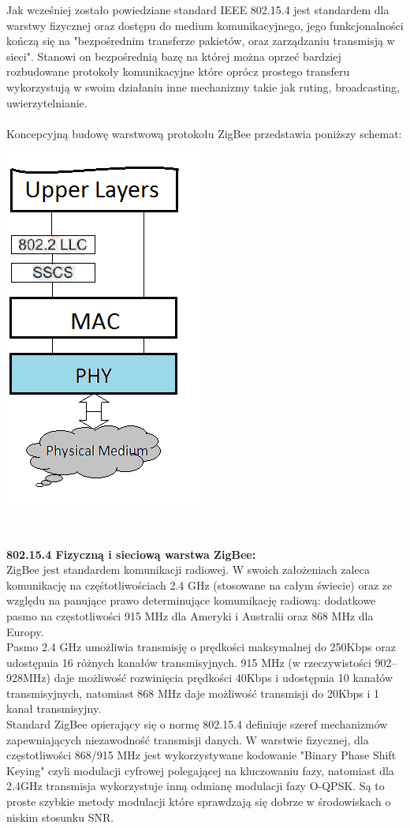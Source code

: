 \tab 	Jak wcześniej zostało powiedziane standard IEEE 802.15.4 jest standardem dla warstwy fizycznej oraz dostępu do medium komunikacyjnego, jego funkcjonalności kończą się na "bezpośrednim transferze pakietów, oraz zarządzaniu transmisją w sieci". Stanowi on bezpośrednią bazę na której można oprzeć bardziej rozbudowane protokoły komunikacyjne które oprócz prostego transferu wykorzystują w swoim działaniu inne mechanizmy takie jak ruting, broadcasting, uwierzytelnianie. \\
\\
Koncepcyjną budowę warstwową protokołu ZigBee przedstawia poniższy schemat: \\
\centerline{\includegraphics[scale=0.5]{./img/img_1__2_1_3}}
\\

\par \tab \textbf{802.15.4 Fizyczną i sieciową warstwa ZigBee:} \\ 
\tab 	ZigBee jest standardem komunikacji radiowej. W swoich założeniach zaleca komunikację na częśtotliwościach 2.4 GHz (stosowane na całym świecie) oraz ze względu na panujące prawo determinujące komumikację radiową: dodatkowe pasmo na częstotliwości 915 MHz dla Ameryki i Australii oraz 868 MHz dla Europy. \\
\tab 	Pasmo 2.4 GHz umożliwia transmisję o prędkości maksymalnej do 250Kbps oraz udostępnia 16 różnych kanałów transmisyjnych. 915 MHz (w rzeczywistości 902–928MHz) daje możliwość rozwinięcia prędkości 40Kbps i udostępnia 10 kanałów transmisyjnych, natomiast 868 MHz daje możliwość transmisji do 20Kbps i 1 kanał transmisyjny.\\
Standard ZigBee opierający się o normę 802.15.4 definiuje szeref mechanizmów zapewniających niezawodność transmisji danych. W warstwie fizycznej, dla częstotliwości 868/915 MHz jest wykorzystywane kodowanie "Binary Phase Shift Keying" czyli modulacji cyfrowej polegającej na kluczowaniu fazy, natomiast dla 2.4GHz transmisja wykorzystuje inną odmianę modulacji fazy O-QPSK. Są to proste szybkie metody modulacji które sprawdzają się dobrze w środowiskach o niskim stosunku SNR. \\

